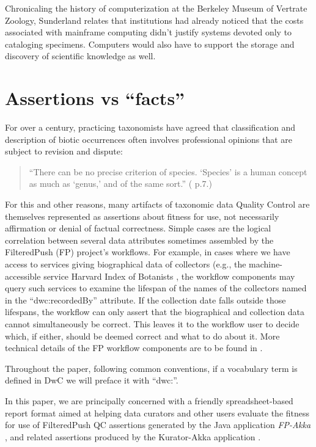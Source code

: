 \documentclass{article}
\begin{document}
Chronicaling the history of computerization at the Berkeley Museum of Vertrate Zoology, Sunderland \citep{Sunderland2013150} relates that institutions had already noticed that the costs associated with mainframe computing didn't justify systems devoted only to cataloging specimens. Computers would also have to support the storage and discovery of scientific knowledge as well.  

\section{Assertions vs “facts”}
For over a century, practicing taxonomists have agreed that classification and description of biotic occurrences often involves professional opinions that are subject to revision and dispute:
\begin{quotation}
``There can be no precise criterion of species. `Species' is a human concept as much as `genus,' and of the same sort.'' (\citep{lutz_variation_1908} p.7.)
\end{quotation}

For this and other reasons, many artifacts of taxonomic data Quality Control are themselves represented as assertions about fitness for use, not necessarily affirmation or denial of factual correctness. Simple cases are the logical correlation between several data attributes sometimes assembled by the FilteredPush (FP) \citep{filteredpushWeb_2016} project's workflows. For example, in cases where we have access to services giving biographical data of collectors (e.g., the machine-accessible service Harvard Index of Botanists \citep{harvard_university_herbaria_&_libraries_index_2013}, the workflow components may query such services to examine the lifespan of the names of the collectors named in the “dwc:recordedBy” attribute. If the collection date falls outside those lifespans, the workflow can only assert that the biographical and collection data cannot simultaneously be correct. This leaves it to the workflow user to decide which, if either, should be deemed correct and what to do about it. More technical details of the FP workflow components are to be found in \citep{song_towards_2014}.

Throughout the paper, following common conventions, if a vocabulary term is defined in DwC we will preface it with ``dwc:''.

In this paper, we are principally concerned with a friendly spreadsheet-based report format aimed at helping data curators and other users evaluate the fitness for use of FilteredPush QC assertions generated by the Java application \emph{FP-Akka} \cite{FilteredPushWiki}, and related assertions produced by the Kurator-Akka application \citep{kurator_akka} .
\end{document}
